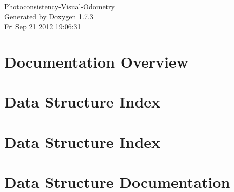 \documentclass[a4paper]{book}
\begin{document}
\hypersetup{pageanchor=false}
\begin{titlepage}
\vspace*{7cm}
\begin{center}
{\Large Photoconsistency-\/Visual-\/Odometry }\\
\vspace*{1cm}
{\large Generated by Doxygen 1.7.3}\\
\vspace*{0.5cm}
{\small Fri Sep 21 2012 19:06:31}\\
\end{center}
\end{titlepage}
\clearemptydoublepage
{}
\tableofcontents
\clearemptydoublepage
{}
\hypersetup{pageanchor=true}
\chapter{Documentation Overview}
\label{index}\hypertarget{index}{}
\chapter{Data Structure Index}

\chapter{Data Structure Index}

\chapter{Data Structure Documentation}












\printindex
\end{document}
